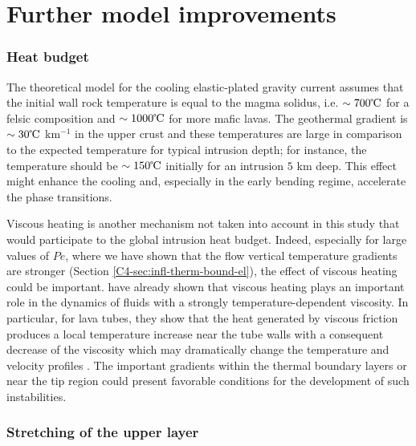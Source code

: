 \section{Further model improvements}
\label{sec:generalization-model}

\subsubsection*{Heat budget}
\label{C7-Heat_Budget}

The theoretical  model for the cooling  elastic-plated gravity current
assumes that the  initial wall rock temperature is equal  to the magma
solidus,  i.e.   $\sim 700  \celsius$  for  a felsic  composition  and
$\sim 1000 \celsius$ for more mafic lavas.  The geothermal gradient is
$\sim 30 \celsius$ km$^{-1}$ in the upper crust and these temperatures
are  large  in comparison  to  the  expected temperature  for  typical
intrusion   depth;   for   instance,   the   temperature   should   be
$\sim  150 \celsius$  initially for  an intrusion  $5$ km  deep.  This
effect might enhance the cooling  and, especially in the early bending
regime, accelerate the phase transitions.

Viscous heating  is another mechanism  not taken into account  in this
study   that  would   participate   to  the   global  intrusion   heat
budget. Indeed,  especially for  large values of  $Pe$, where  we have
shown  that  the  flow  vertical temperature  gradients  are  stronger
(Section  \ref{C4-sec:infl-therm-bound-el}),  the  effect  of  viscous
heating could  be important.  \citet{Costa:2005bq} have  already shown
that viscous heating plays an important role in the dynamics of fluids
with a  strongly temperature-dependent  viscosity. In  particular, for
lava  tubes, they  show that  the heat  generated by  viscous friction
produces  a local  temperature increase  near  the tube  walls with  a
consequent decrease of the viscosity which may dramatically change the
temperature             and              velocity             profiles
\citep{Costa:2002cj,Costa:2003wk,Costa:2005bq}.      The     important
gradients within  the thermal boundary  layers or near the  tip region
could  present  favorable  conditions  for  the  development  of  such
instabilities.

\subsubsection*{Stretching of the upper layer}
\label{Stretchingoftheupper_layer}


